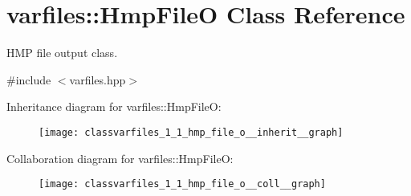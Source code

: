 \hypertarget{classvarfiles_1_1_hmp_file_o}{}\section{varfiles\+:\+:Hmp\+FileO Class Reference}
\label{classvarfiles_1_1_hmp_file_o}


H\+MP file output class.  




{\ttfamily \#include $<$varfiles.\+hpp$>$}



Inheritance diagram for varfiles\+:\+:Hmp\+FileO\+:\nopagebreak
\begin{figure}[H]
\begin{center}
\leavevmode
\texttt{[image: classvarfiles\_1\_1\_hmp\_file\_o\_\_inherit\_\_graph]}
\end{center}
\end{figure}


Collaboration diagram for varfiles\+:\+:Hmp\+FileO\+:\nopagebreak
\begin{figure}[H]
\begin{center}
\leavevmode
\texttt{[image: classvarfiles\_1\_1\_hmp\_file\_o\_\_coll\_\_graph]}
\end{center}
\end{figure}
